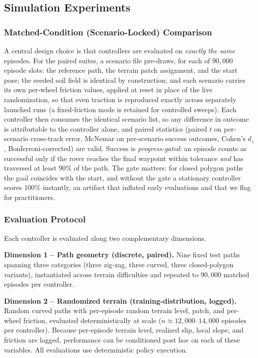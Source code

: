 \documentclass[conference]{IEEEtran}
\begin{document}
\subsection{Simulation Experiments}
\subsubsection{Matched-Condition (Scenario-Locked) Comparison}
A central design choice is that controllers are evaluated on \emph{exactly the same} episodes. For the paired suites, a scenario file pre-draws, for each of $90{,}000$ episode slots: the reference path, the terrain patch assignment, and the start pose; the seeded soil field is identical by construction; and each scenario carries its own per-wheel friction values, applied at reset in place of the live randomization, so that even traction is reproduced exactly across separately launched runs (a fixed-friction mode is retained for controlled sweeps). Each controller then consumes the identical scenario list, so any difference in outcome is attributable to the controller alone, and paired statistics (paired $t$ on per-scenario cross-track error, McNemar on per-scenario success outcomes, Cohen's $d_z$, Bonferroni-corrected) are valid. Success is \emph{progress-gated}: an episode counts as successful only if the rover reaches the final waypoint within tolerance \emph{and} has traversed at least $90\%$ of the path. The gate matters: for closed polygon paths the goal coincides with the start, and without the gate a stationary controller scores $100\%$ instantly, an artifact that inflated early evaluations and that we flag for practitioners.

\subsubsection{Evaluation Protocol}
Each controller is evaluated along two complementary dimensions.

\noindent\textbf{Dimension 1 -- Path geometry (discrete, paired).} Nine fixed test paths spanning three categories (three zig-zag, three curved, three closed-polygon variants), instantiated across terrain difficulties and repeated to $90{,}000$ matched episodes per controller.

\noindent\textbf{Dimension 2 -- Randomized terrain (training-distribution, logged).} Random curved paths with per-episode random terrain level, patch, and per-wheel friction, evaluated deterministically at scale ($n \approx 12{,}000$--$14{,}000$ episodes per controller). Because per-episode terrain level, realized slip, local slope, and friction are logged, performance can be conditioned post hoc on each of these variables. All evaluations use deterministic policy execution.
\end{document}
